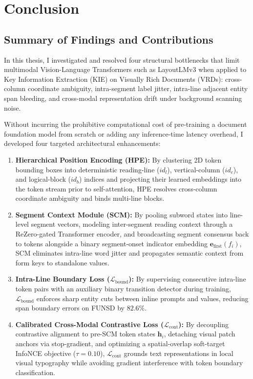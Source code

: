 \chapter{Conclusion}
\label{chap:conclusion}

\section{Summary of Findings and Contributions}
\label{sec:conclusion_summary}

In this thesis, I investigated and resolved four structural bottlenecks that limit multimodal Vision-Language Transformers such as LayoutLMv3 when applied to Key Information Extraction (KIE) on Visually Rich Documents (VRDs): cross-column coordinate ambiguity, intra-segment label jitter, intra-line adjacent entity span bleeding, and cross-modal representation drift under background scanning noise.

Without incurring the prohibitive computational cost of pre-training a document foundation model from scratch or adding any inference-time latency overhead, I developed four targeted architectural enhancements:
\begin{enumerate}
    \item \textbf{Hierarchical Position Encoding (HPE):} By clustering 2D token bounding boxes into deterministic reading-line ($id_l$), vertical-column ($id_c$), and logical-block ($id_b$) indices and projecting their learned embeddings into the token stream prior to self-attention, HPE resolves cross-column coordinate ambiguity and binds multi-line blocks.
    \item \textbf{Segment Context Module (SCM):} By pooling subword states into line-level segment vectors, modeling inter-segment reading context through a ReZero-gated Transformer encoder, and broadcasting segment consensus back to tokens alongside a binary segment-onset indicator embedding $\mathbf{e}_{\text{first}}(f_i)$, SCM eliminates intra-line word jitter and propagates semantic context from form keys to standalone values.
    \item \textbf{Intra-Line Boundary Loss ($\mathcal{L}_{\text{bound}}$):} By supervising consecutive intra-line token pairs with an auxiliary binary transition detector during training, $\mathcal{L}_{\text{bound}}$ enforces sharp entity cuts between inline prompts and values, reducing span boundary errors on FUNSD by $82.6\%$.
    \item \textbf{Calibrated Cross-Modal Contrastive Loss ($\mathcal{L}_{\text{cont}}$):} By decoupling contrastive alignment to pre-SCM token states $\mathbf{h}_i$, detaching visual patch anchors via stop-gradient, and optimizing a spatial-overlap soft-target InfoNCE objective ($\tau = 0.10$), $\mathcal{L}_{\text{cont}}$ grounds text representations in local visual typography while avoiding gradient interference with token boundary classification.
\end{enumerate}

